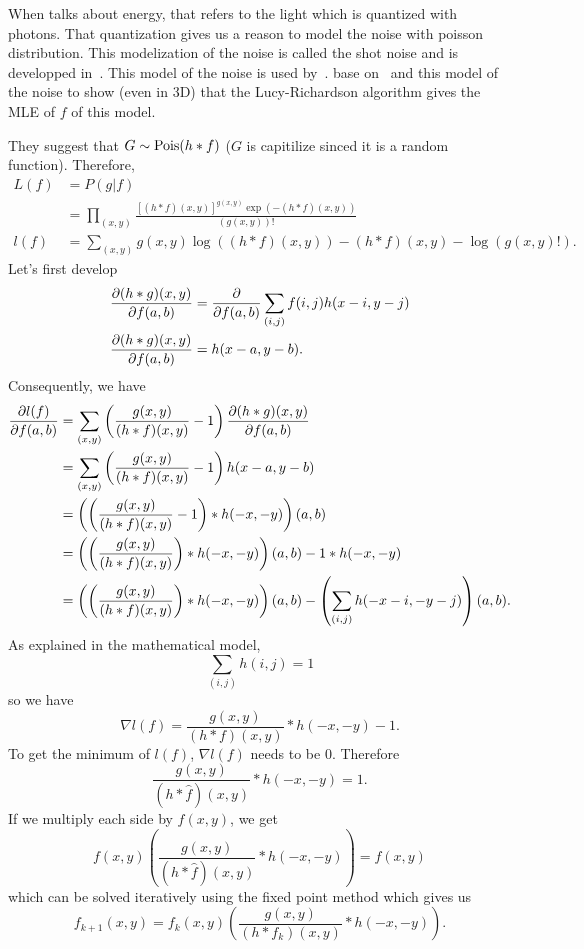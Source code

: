 When \cite{richardson1972bayesian} talks about energy,
that refers to the light which is quantized with photons.
That quantization gives us a reason to model the noise with
poisson distribution.
This modelization of the noise is called the shot noise and
is developped in~\cite{blanter2000shot}.
This model of the noise is used by~\cite{hebert1989generalized}.
\cite{temerinac2010tile} base on~\cite{hebert1989generalized}
and this model of the noise to show (even in 3D)
that the Lucy-Richardson algorithm gives the MLE of $f$ of this
model.

They suggest that $G \sim \operatorname{Pois}(h * f)$ ($G$ is capitilize sinced it is a random function).
Therefore,
\begin{align*}
  L(f) & = P(g|f)\\
  & = \prod_{(x,y)} \frac{[(h*f)(x,y)]^{g(x,y)} \exp(-(h*f)(x,y))}{(g(x,y))!}\\
  l(f) & = \sum_{(x,y)} g(x,y)\log((h*f)(x,y)) - (h*f)(x,y) -\log(g(x,y)!).
\end{align*}
Let's first develop
\begin{align*}
  \frac{\partial (h*g)(x,y)}{\partial f(a,b)} & = \frac{\partial }{\partial f(a,b)}\sum_{(i,j)}f(i,j)h(x-i,y-j)\\
  \frac{\partial (h*g)(x,y)}{\partial f(a,b)} & = h(x-a,y-b).
\end{align*}
Consequently, we have
\begin{align*}
  \frac{\partial l(f)}{\partial f(a,b)} & = \sum_{(x,y)} \left(\frac{g(x,y)}{(h*f)(x,y)} - 1\right) \frac{\partial (h*g)(x,y)}{\partial f(a,b)}\\
  & = \sum_{(x,y)} \left(\frac{g(x,y)}{(h*f)(x,y)} - 1\right) h(x-a,y-b)\\
  & = \left(\left(\frac{g(x,y)}{(h*f)(x,y)} - 1\right) * h(-x,-y)\right)(a,b)\\
  & = \left(\left(\frac{g(x,y)}{(h*f)(x,y)}\right) * h(-x,-y)\right)(a,b) - 1 * h(-x,-y)\\
  & = \left(\left(\frac{g(x,y)}{(h*f)(x,y)}\right) * h(-x,-y)\right)(a,b) - \left(\sum_{(i,j)} h(-x-i,-y-j)\right)(a,b).
\end{align*}
As explained in the mathematical model,
\[ \sum_{(i,j)} h(i,j) = 1 \]
so we have
\[ \nabla l(f) = \frac{g(x,y)}{(h*f)(x,y)} * h(-x,-y) - 1. \]
To get the minimum of $l(f)$, $\nabla l(f)$ needs to be 0.
Therefore %
\[ \frac{g(x,y)}{(h*\hat{f})(x,y)} * h(-x,-y) = 1. \]
If we multiply each side by $f(x,y)$, we get
\[ f(x,y)\left(\frac{g(x,y)}{(h*\hat{f})(x,y)} * h(-x,-y)\right) = f(x,y) \]
which can be solved iteratively using the fixed point method which gives us
\[ f_{k+1}(x,y) = f_k(x,y)\left(\frac{g(x,y)}{(h*f_k)(x,y)} * h(-x,-y)\right). \]


